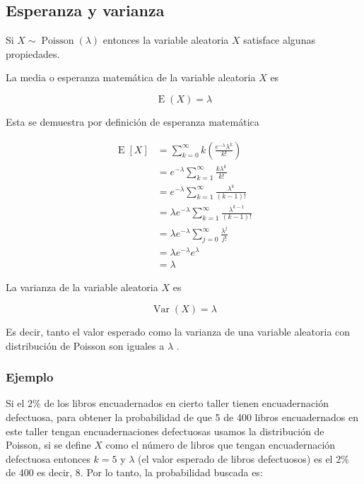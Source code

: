\documentclass[]{book}
\theoremstyle{plain}
\theoremstyle{definition}
\theoremstyle{definition} %
\begin{document}
\hypertarget{esperanza-y-varianza-2}{%
\subsection{Esperanza y varianza}\label{esperanza-y-varianza-2}}

Si \(\displaystyle X\sim \operatorname {Poisson} (\lambda )\) entonces
la variable aleatoria \(X\) satisface algunas propiedades.

La media o esperanza matemática de la variable aleatoria \(X\) es

\[\displaystyle \operatorname {E} (X)=\lambda \]

Esta se demuestra por definición de esperanza matemática

\[\displaystyle {\begin{aligned}\operatorname {E} [X]&=\sum _{k=0}^{\infty }k\left({\frac {e^{-\lambda }\lambda ^{k}}{k!}}\right)\\&=e^{-\lambda }\sum _{k=1}^{\infty }{\frac {k\lambda ^{k}}{k!}}\\&=e^{-\lambda }\sum _{k=1}^{\infty }{\frac {\lambda ^{k}}{(k-1)!}}\\&=\lambda e^{-\lambda }\sum _{k=1}^{\infty }{\frac {\lambda ^{k-1}}{(k-1)!}}\\&=\lambda e^{-\lambda }\sum _{j=0}^{\infty }{\frac {\lambda ^{j}}{j!}}\\&=\lambda e^{-\lambda }e^{\lambda }\\&=\lambda \end{aligned}}\]

La varianza de la variable aleatoria \(X\) es

\[\displaystyle \operatorname {Var} (X)=\lambda \]

Es decir, tanto el valor esperado como la varianza de una variable
aleatoria con distribución de Poisson son iguales a \(\lambda\) .

\hypertarget{ejemplo-7}{%
\subsubsection{Ejemplo}\label{ejemplo-7}}

Si el \(\displaystyle 2\%\) de los libros encuadernados en cierto taller
tienen encuadernación defectuosa, para obtener la probabilidad de que 5
de 400 libros encuadernados en este taller tengan encuadernaciones
defectuosas usamos la distribución de Poisson, si se define \(X\) como
el número de libros que tengan encuadernación defectuosa entonces
\(\displaystyle k=5\) y \(\lambda\) (el valor esperado de libros
defectuosos) es el \(\displaystyle 2\%\) de 400 es decir, 8. Por lo
tanto, la probabilidad buscada es:
\end{document}
